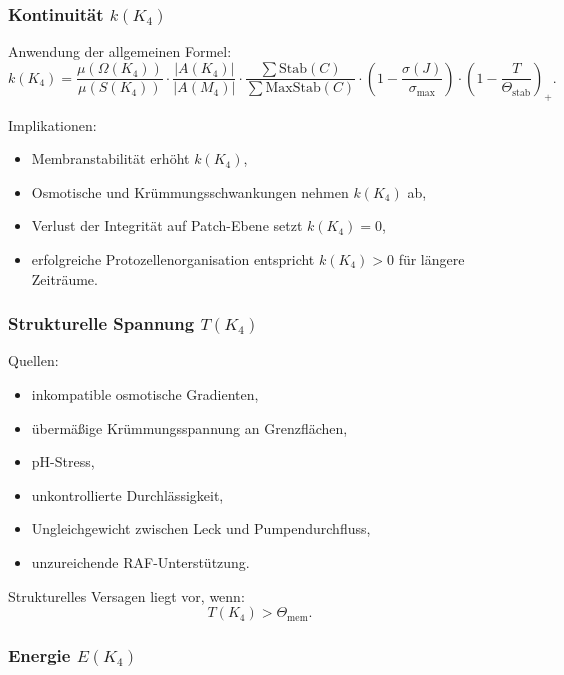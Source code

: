 \subsubsection{Kontinuität \texorpdfstring{$k(K_4)$}{k(K_4)}}

Anwendung der allgemeinen Formel:
\[
k(K_4) =
\frac{\mu(\Omega(K_4))}{\mu(S(K_4))}
\cdot
\frac{|A(K_4)|}{|A(M_4)|}
\cdot
\frac{\sum \mathrm{Stab}(C)}{\sum \mathrm{MaxStab}(C)}
\cdot
(1 - \frac{\sigma(J)}{\sigma_{\max}})
\cdot
(1 - \frac{T}{\Theta_{\mathrm{stab}}})_+.
\]

Implikationen:
\begin{itemize}
    \item Membranstabilität erhöht $k(K_4)$,
    \item Osmotische und Krümmungsschwankungen nehmen $k(K_4)$ ab,
    \item Verlust der Integrität auf Patch-Ebene setzt $k(K_4)=0$,
    \item erfolgreiche Protozellenorganisation entspricht
          $k(K_4)>0$ für längere Zeiträume.
\end{itemize}

\subsubsection{Strukturelle Spannung \texorpdfstring{$T(K_4)$}{T(K_4)}}

Quellen:
\begin{itemize}
    \item inkompatible osmotische Gradienten,
    \item übermäßige Krümmungsspannung an Grenzflächen,
    \item pH-Stress,
    \item unkontrollierte Durchlässigkeit,
    \item Ungleichgewicht zwischen Leck und Pumpendurchfluss,
    \item unzureichende RAF-Unterstützung.
\end{itemize}

Strukturelles Versagen liegt vor, wenn:
\[
T(K_4) > \Theta_{\mathrm{mem}}.
\]

\subsubsection{Energie \texorpdfstring{$E(K_4)$}{E(K_4)}}


